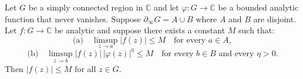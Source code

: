 Let $G$ be a simply connected region in $\mathbb{C}$ and let $\varphi: G \to \mathbb{C}$ be a bounded analytic function that never vanishes. Suppose $\partial_\infty G = A \cup B$ where $A$ and $B$ are disjoint. Let $f: G \to \mathbb{C}$ be analytic and suppose there exists a constant $M$ such that:
\[
\text{(a)}\quad \limsup_{z \to a} |f(z)| \leq M \quad \text{for every } a \in A,
\]
\[
\text{(b)}\quad \limsup_{z \to b} |f(z)| \, |\varphi(z)|^\eta \leq M \quad \text{for every } b \in B \text{ and every } \eta > 0.
\]
Then $|f(z)| \leq M$ for all $z \in G$.
